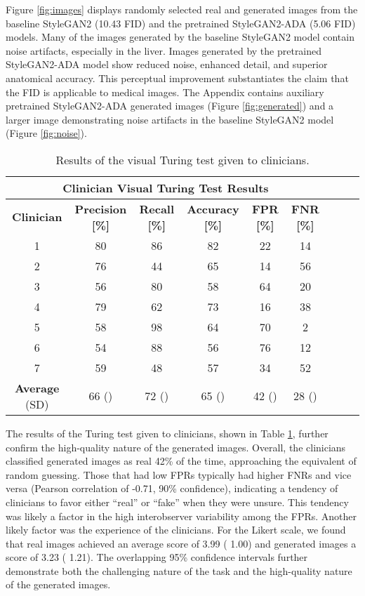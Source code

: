 \documentclass[runningheads]{llncs}
\begin{document}
Figure \ref{fig:images} displays randomly selected real and generated images from the baseline StyleGAN2 (10.43 FID) and the pretrained StyleGAN2-ADA (5.06 FID) models.
Many of the images generated by the baseline StyleGAN2 model contain noise artifacts, especially in the liver.
Images generated by the pretrained StyleGAN2-ADA model show reduced noise, enhanced detail, and superior anatomical accuracy.
This perceptual improvement substantiates the claim that the FID is applicable to medical images.
The Appendix contains auxiliary pretrained StyleGAN2-ADA generated images (Figure \ref{fig:generated}) and a larger image demonstrating noise artifacts in the baseline StyleGAN2 model (Figure \ref{fig:noise}).

\begin{table}
    \centering
    \caption{Results of the visual Turing test given to clinicians.}
    \begin{tabular}{|c|c|c|c|c|c|c|c|c|}
        \multicolumn{6}{c}{\textbf{Clinician Visual Turing Test Results}} \\
        \hline
         \textbf{Clinician}
            & \textbf{Precision [\%]}
            & \textbf{Recall [\%]}
            & \textbf{Accuracy [\%]}
            & \textbf{FPR [\%]}
            & \textbf{FNR [\%]} \\
         \hline
        1 & 80 & 86 & 82 & 22 & 14\\
        \hline
        2 & 76 & 44 & 65 & 14 & 56 \\
        \hline
        3 & 56 & 80 & 58 & 64 & 20 \\
        \hline
        4 & 79 & 62 & 73 & 16 & 38 \\
        \hline
        5 & 58 & 98 & 64 & 70 & 2 \\
        \hline
        6 & 54 & 88 & 56 & 76 & 12 \\
        \hline
        7 & 59 & 48 & 57 & 34 & 52 \\
        \hline
        \textbf{Average} (SD)
            & 66 ()
            & 72 ()
            & 65 ()
            & 42 ()
            & 28 ()\\
        \hline
    \end{tabular}
    \label{tab:vtt}
\end{table}

The results of the Turing test given to clinicians, shown in Table \ref{tab:vtt}, further confirm the high-quality nature of the generated images.
Overall, the clinicians classified generated images as real 42\% of the time, approaching the equivalent of random guessing.
Those that had low FPRs typically had higher FNRs and vice versa (Pearson correlation of -0.71, 90\% confidence), indicating a tendency of clinicians to favor either ``real'' or ``fake'' when they were unsure.
This tendency was likely a factor in the high interobserver variability among the FPRs.
Another likely factor was the experience of the clinicians.
For the Likert scale, we found that real images achieved an average score of 3.99 ( 1.00) and generated images a score of 3.23 ( 1.21).
The overlapping 95\% confidence intervals further demonstrate both the challenging nature of the task and the high-quality nature of the generated images.
\end{document}
